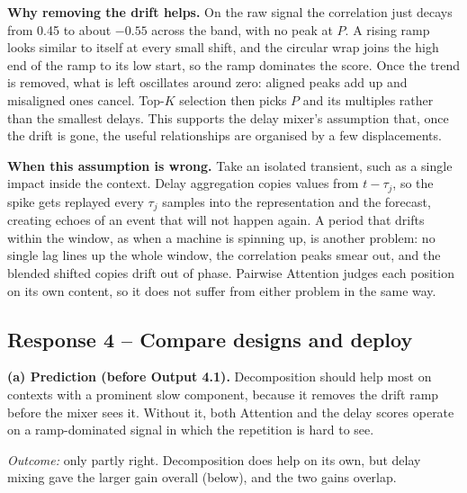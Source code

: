\documentclass[11pt]{article}
\begin{document}
\textbf{Why removing the drift helps.} On the raw signal the correlation just decays from 0.45 to
about $-0.55$ across the band, with no peak at $P$. A rising ramp looks similar to itself at every
small shift, and the circular wrap joins the high end of the ramp to its low start, so the ramp
dominates the score. Once the trend is removed, what is left oscillates around zero: aligned peaks
add up and misaligned ones cancel. Top-$K$ selection then picks $P$ and its multiples rather than
the smallest delays. This supports the delay mixer's assumption that, once the drift is gone, the
useful relationships are organised by a few displacements.

\textbf{When this assumption is wrong.} Take an isolated transient, such as a single impact inside
the context. Delay aggregation copies values from $t-\tau_j$, so the spike gets replayed every
$\tau_j$ samples into the representation and the forecast, creating echoes of an event that will
not happen again. A period that drifts within the window, as when a machine is spinning up, is
another problem: no single lag lines up the whole window, the correlation peaks smear out, and the
blended shifted copies drift out of phase. Pairwise Attention judges each position on its own
content, so it does not suffer from either problem in the same way.

\subsection*{Response 4 -- Compare designs and deploy}

\textbf{(a) Prediction (before Output 4.1).} Decomposition should help most on contexts with a
prominent slow component, because it removes the drift ramp before the mixer sees it. Without it,
both Attention and the delay scores operate on a ramp-dominated signal in which the repetition is
hard to see.

\noindent\emph{Outcome:} only partly right. Decomposition does help on its own, but delay mixing
gave the larger gain overall (below), and the two gains overlap.
\end{document}
